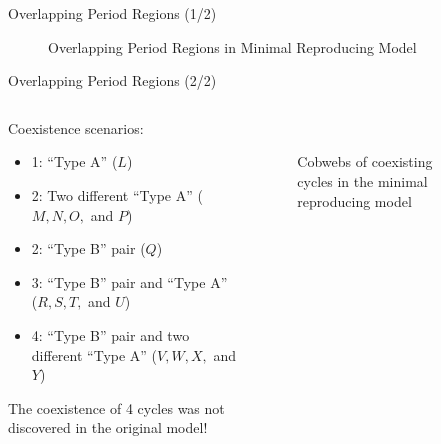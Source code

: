 \begin{frame}{Overlapping Period Regions (1/2)}
    \vspace{-1.0em}
    \begin{figure}
        \centering
        \caption{Overlapping Period Regions in Minimal Reproducing Model}
    \end{figure}
\end{frame}

\begin{frame}{Overlapping Period Regions (2/2)}
    \begin{columns}
        \begin{column}{.6 \textwidth}
            Coexistence scenarios:
            \begin{itemize}
                \item 1: ``Type A'' ($L$)
                \item 2: Two different ``Type A'' ($M, N, O,$ and $P$)
                \item 2: ``Type B'' pair ($Q$)
                \item 3: ``Type B'' pair and ``Type A'' ($R, S, T,$ and $U$)
                \item 4: ``Type B'' pair and two different ``Type A'' ($V, W, X,$ and $Y$)
            \end{itemize}

            \vspace{2em}
            The coexistence of 4 cycles was not discovered in the original model!
        \end{column}
        \begin{column}{.4 \textwidth}
            \vspace{-3.0em}
            \begin{figure}
                \centering
                \quad
                \\
                \quad
                \caption{Cobwebs of coexisting cycles in the minimal reproducing model}
            \end{figure}
        \end{column}
    \end{columns}
\end{frame}
